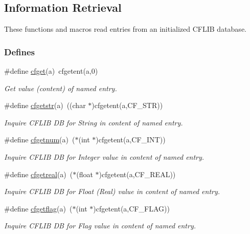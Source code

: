 \hypertarget{group__retrieval}{
\subsection{Information Retrieval}
\label{group__retrieval}
}
These functions and macros read entries from an initialized CFLIB database.  


\subsubsection*{Defines}
\begin{CompactItemize}
\item 
\#define \hyperlink{group__retrieval_g5e2da3f6cf3e36a910362660d167f790}{cfget}(a)~cfgetent(a,0)
\begin{CompactList}\small\item\em Get value (content) of named entry. \item\end{CompactList}\item 
\#define \hyperlink{group__retrieval_g8cf5f53c5b05ec5ca4f5145010f84eb4}{cfgetstr}(a)~((char $\ast$)cfgetent(a,CF\_\-STR))
\begin{CompactList}\small\item\em Inquire CFLIB DB for String in content of named entry. \item\end{CompactList}\item 
\#define \hyperlink{group__retrieval_g591b741a05205e1ddd599146b996d755}{cfgetnum}(a)~($\ast$(int $\ast$)cfgetent(a,CF\_\-INT))
\begin{CompactList}\small\item\em Inquire CFLIB DB for Integer value in content of named entry. \item\end{CompactList}\item 
\#define \hyperlink{group__retrieval_g5f5ec5179e69c2bdfb06ff38a5af16e4}{cfgetreal}(a)~($\ast$(float $\ast$)cfgetent(a,CF\_\-REAL))
\begin{CompactList}\small\item\em Inquire CFLIB DB for Float (Real) value in content of named entry. \item\end{CompactList}\item 
\#define \hyperlink{group__retrieval_gc0188464b59267e14b5c44efb1d4a0f2}{cfgetflag}(a)~($\ast$(int $\ast$)cfgetent(a,CF\_\-FLAG))
\begin{CompactList}\small\item\em Inquire CFLIB DB for Flag value in content of named entry. \item\end{CompactList}\item 

\end{CompactItemize}
